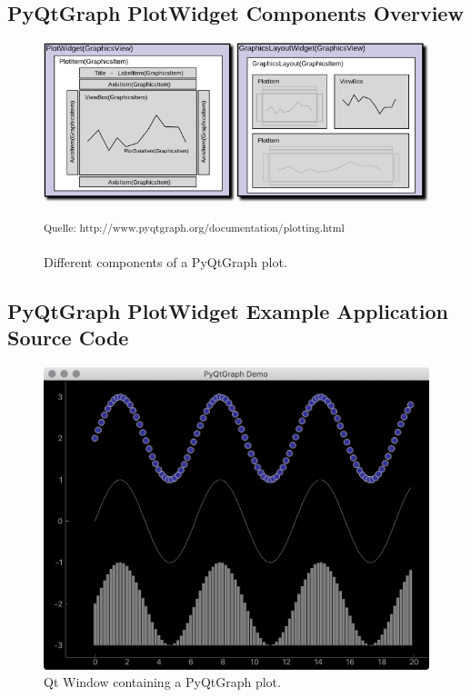 
\subsection{PyQtGraph PlotWidget Components Overview}

\begin{figure}[h]
    \centering
    \includegraphics[width=14cm]{resources/img/PyQtGraphContent}
    \caption{Different components of a PyQtGraph plot.}
    \small\textsuperscript{Quelle: http://www.pyqtgraph.org/documentation/plotting.html}
    \label{a:fig:pyqtgraph:content}
\end{figure}

\clearpage


\subsection{PyQtGraph PlotWidget Example Application Source Code}

\begin{figure}[h]
    \centering
    \includegraphics[width=14cm]{resources/img/PyQtGraphDemo}
    \caption{Qt Window containing a PyQtGraph plot.}
    \label{a:fig:pyqtgraph:window}
\end{figure}

